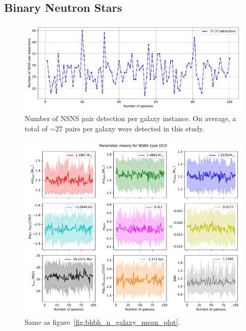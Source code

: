\subsection{Binary Neutron Stars}
\begin{figure}[!h]
	\centering
    \includegraphics[width=\columnwidth]{analysis_data/004__images_for_latex/NSNS_n_detections}
	\caption{Number of NSNS pair detection per galaxy instance. On average, a total of $\sim$27 pairs per galaxy were detected in this study.}
	\label{fig:nsnsndetections}
\end{figure}

\begin{figure}[!h]
	\centering
    \includegraphics[width=\columnwidth]{analysis_data/004__images_for_latex/NSNS_n_galaxy_mean_plot}
	\caption{Same as figure~\ref{fig:bhbh_n_galaxy_mean_plot}.}
	\label{fig:nsns_n_galaxy_mean_plot}
\end{figure}

\newpage
